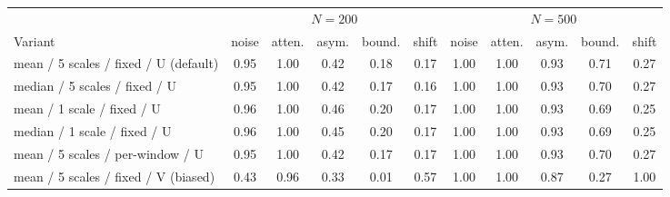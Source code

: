 \setlength{\tabcolsep}{2pt}\renewcommand{\arraystretch}{1.1}%
\begin{tabular}{>{\raggedright\arraybackslash}p{108pt}|ccccc|ccccc}
\toprule
 & \multicolumn{5}{c|}{$N=200$} & \multicolumn{5}{c}{$N=500$} \\
Variant & noise & atten. & asym. & bound. & shift & noise & atten. & asym. & bound. & shift \\
\midrule
mean / 5 scales / fixed / U (default) & 0.95 & 1.00 & 0.42 & 0.18 & 0.17 & 1.00 & 1.00 & 0.93 & 0.71 & 0.27 \\
median / 5 scales / fixed / U & 0.95 & 1.00 & 0.42 & 0.17 & 0.16 & 1.00 & 1.00 & 0.93 & 0.70 & 0.27 \\
mean / 1 scale / fixed / U & 0.96 & 1.00 & 0.46 & 0.20 & 0.17 & 1.00 & 1.00 & 0.93 & 0.69 & 0.25 \\
median / 1 scale / fixed / U & 0.96 & 1.00 & 0.45 & 0.20 & 0.17 & 1.00 & 1.00 & 0.93 & 0.69 & 0.25 \\
mean / 5 scales / per-window / U & 0.95 & 1.00 & 0.42 & 0.17 & 0.17 & 1.00 & 1.00 & 0.93 & 0.70 & 0.27 \\
mean / 5 scales / fixed / V (biased) & 0.43 & 0.96 & 0.33 & 0.01 & 0.57 & 1.00 & 1.00 & 0.87 & 0.27 & 1.00 \\
\bottomrule
\end{tabular}